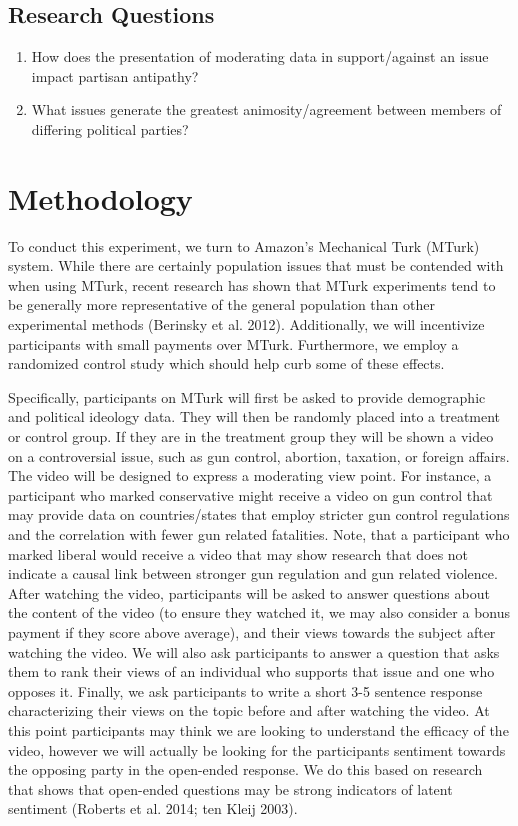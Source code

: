 \documentclass[12pt]{article}
\begin{document}
\subsection{Research Questions}
\begin{enumerate}
	\item How does the presentation of moderating data in support/against an issue impact partisan antipathy?
	\item What issues generate the greatest animosity/agreement between members of differing political parties?
\end{enumerate}

\section{Methodology}

To conduct this experiment, we turn to Amazon’s Mechanical Turk (MTurk) system. While there are certainly population issues that must be contended with when using MTurk, recent research has shown that MTurk experiments tend to be generally more representative of the general population than other experimental methods (Berinsky et al. 2012). Additionally, we will incentivize participants with small payments over MTurk.  Furthermore, we employ a randomized control study which should help curb some of these effects.

Specifically, participants on MTurk will first be asked to provide demographic and political ideology data. They will then be randomly placed into a treatment or control group. If they are in the treatment group they will be shown a video on a controversial issue, such as gun control, abortion, taxation, or foreign affairs. The video will be designed to express a moderating view point. For instance, a participant who marked conservative might receive a video on gun control that may provide data on countries/states that employ stricter gun control regulations and the correlation with fewer gun related fatalities. Note, that a participant who marked liberal would receive a video that may show research that does not indicate a causal link between stronger gun regulation and gun related violence. After watching the video, participants will be asked to answer questions about the content of the video (to ensure they watched it, we may also consider a bonus payment if they score above average), and their views towards the subject after watching the video. We will also ask participants to answer a question that asks them to rank their views of an individual who supports that issue and one who opposes it. Finally, we ask participants to write a short 3-5 sentence response characterizing their views on the topic before and after watching the video.  At this point participants may think we are looking to understand the efficacy of the video, however we will actually be looking for the participants sentiment towards the opposing party in the open-ended response. We do this based on research that shows that open-ended questions may be strong indicators of latent sentiment (Roberts et al. 2014; ten Kleij 2003). 
\end{document}
